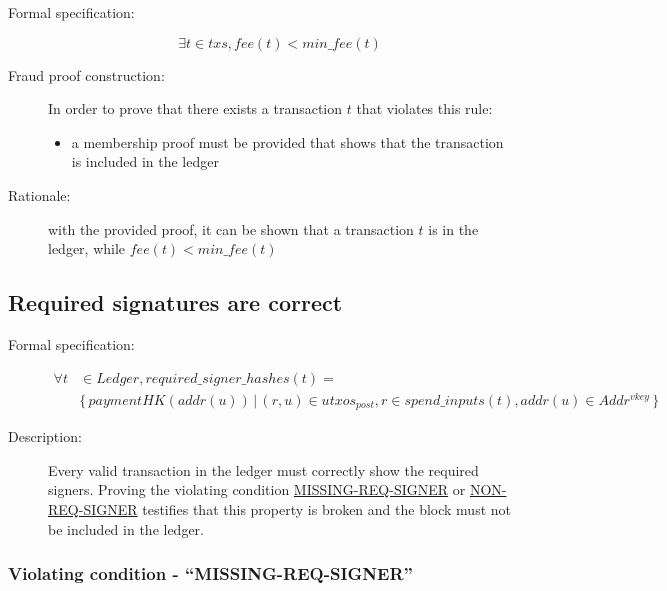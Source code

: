 \documentclass[../midgard.tex]{subfiles}
\begin{document}
\begin{description}

\item[Formal specification:]
\begin{equation*}
    \exists t \in txs, fee(t) < min\_fee(t)
\end{equation*}

\item[Fraud proof construction:] In order to prove that there exists a transaction $t$ that violates this rule:
\begin{itemize}
    \item a membership proof must be provided that shows that the transaction is included in the ledger
\end{itemize}

\item[Rationale:] with the provided proof, it can be shown that a transaction $t$ is in the ledger, while $fee(t) < min\_fee(t)$

\end{description}

\subsection{Required signatures are correct}

\begin{description}

\item[Formal specification:]
\begin{equation*}
\begin{split}
    \forall t & \in Ledger, required\_signer\_hashes(t) = \\
    & \{ \, paymentHK(addr(u)) \, | \, (r, u) \in utxos_{post}, r \in spend\_inputs(t), addr(u) \in Addr^{vkey} \, \}
\end{split}
\end{equation*}
    
\item[Description:] Every valid transaction in the ledger must correctly show the required signers.
  Proving the violating condition \hyperref[sec:MISSING-REQ-SIGNER]{MISSING-REQ-SIGNER} or \hyperref[sec:NON-REQ-SIGNER]{NON-REQ-SIGNER} testifies that this property is broken and the block must not be included in the ledger.
    
\end{description}

\subsubsection{Violating condition - ``MISSING-REQ-SIGNER''}
\label{sec:MISSING-REQ-SIGNER}
\end{document}
